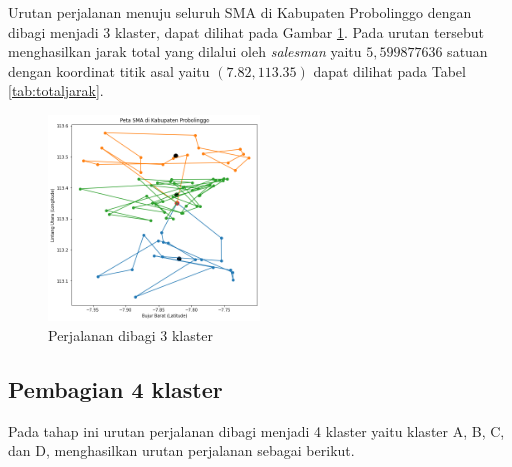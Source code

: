 Urutan perjalanan menuju seluruh SMA di Kabupaten Probolinggo dengan dibagi menjadi 3 klaster, dapat dilihat pada Gambar \ref{fig:hasil_mtsp3}. Pada urutan tersebut menghasilkan jarak total yang dilalui oleh \textit{salesman} yaitu $5,599877636$ satuan dengan koordinat titik asal yaitu $(7.82, 113.35)$ dapat dilihat pada Tabel \ref{tab:totaljarak}.

\begin{figure}[H]
\centering
\includegraphics[width=0.5\textwidth]{Gambar/hasil_mtsp/3}
\caption{Perjalanan dibagi 3 klaster}
\label{fig:hasil_mtsp3}
\end{figure}

\subsection{Pembagian 4 klaster}

Pada tahap ini urutan perjalanan dibagi menjadi 4 klaster yaitu klaster A, B, C, dan D, menghasilkan urutan perjalanan sebagai berikut.

